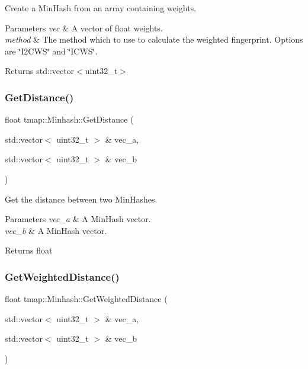 Create a Min\+Hash from an array containing weights. 


\begin{DoxyParams}{Parameters}
{\em vec} & A vector of float weights. \\
\hline
{\em method} & The method which to use to calculate the weighted fingerprint. Options are \char`\"{}\+I2\+C\+W\+S\char`\"{} and \char`\"{}\+I\+C\+W\+S\char`\"{}. \\
\hline
\end{DoxyParams}
\begin{DoxyReturn}{Returns}
std\+::vector$<$uint32\+\_\+t$>$ 
\end{DoxyReturn}
\mbox{\label{classtmap_1_1Minhash_a21df254dd86462a1dcbe45285c747e71}} 
\subsubsection{\texorpdfstring{Get\+Distance()}{GetDistance()}}
{\footnotesize\ttfamily float tmap\+::\+Minhash\+::\+Get\+Distance (\begin{DoxyParamCaption}\item[{std\+::vector$<$ uint32\+\_\+t $>$ \&}]{vec\+\_\+a,  }\item[{std\+::vector$<$ uint32\+\_\+t $>$ \&}]{vec\+\_\+b }\end{DoxyParamCaption})}



Get the distance between two Min\+Hashes. 


\begin{DoxyParams}{Parameters}
{\em vec\+\_\+a} & A Min\+Hash vector. \\
\hline
{\em vec\+\_\+b} & A Min\+Hash vector. \\
\hline
\end{DoxyParams}
\begin{DoxyReturn}{Returns}
float 
\end{DoxyReturn}
\mbox{\label{classtmap_1_1Minhash_a7a8090c1629a6783fe0e17b227bd59ca}} 
\subsubsection{\texorpdfstring{Get\+Weighted\+Distance()}{GetWeightedDistance()}}
{\footnotesize\ttfamily float tmap\+::\+Minhash\+::\+Get\+Weighted\+Distance (\begin{DoxyParamCaption}\item[{std\+::vector$<$ uint32\+\_\+t $>$ \&}]{vec\+\_\+a,  }\item[{std\+::vector$<$ uint32\+\_\+t $>$ \&}]{vec\+\_\+b }\end{DoxyParamCaption})}



